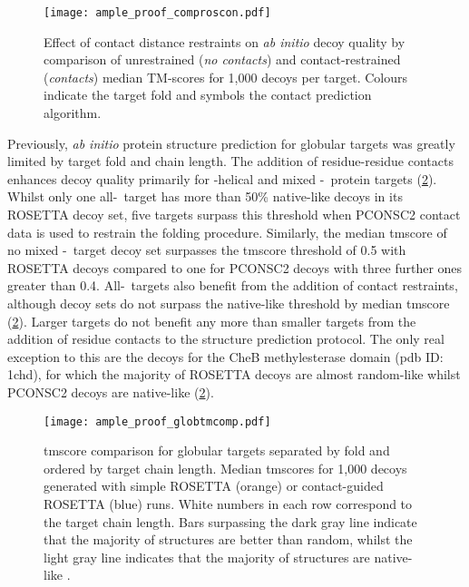 \begin{figure}[H]
    \centering
    \texttt{[image: ample\_proof\_comproscon.pdf]}
    \caption[Effect of contact distance restraints on \textit{ab initio} decoy quality]{Effect of contact distance restraints on \textit{ab initio} decoy quality by comparison of unrestrained (\textit{no contacts}) and contact-restrained (\textit{contacts}) median TM-scores for 1,000 decoys per target. Colours indicate the target fold and symbols the contact prediction algorithm.}
    \label{fig:ample_proof_comproscon}
\end{figure}

Previously, \textit{ab initio} protein structure prediction for globular targets was greatly limited by target fold and chain length. The addition of residue-residue contacts enhances decoy quality primarily for \textalpha-helical and mixed \textalpha-\textbeta\ protein targets (\cref{fig:ample_proof_globtmcomp}). Whilst only one all-\textalpha\ target has more than 50\% native-like decoys in its ROSETTA decoy set, five targets surpass this threshold when PCONSC2 contact data is used to restrain the folding procedure. Similarly, the median \gls{tmscore} of no mixed \textalpha-\textbeta\ target decoy set surpasses the \gls{tmscore} threshold of 0.5 with ROSETTA decoys compared to one for PCONSC2 decoys with three further ones greater than 0.4. All-\textbeta\ targets also benefit from the addition of contact restraints, although decoy sets do not surpass the native-like threshold by median \gls{tmscore} (\cref{fig:ample_proof_globtmcomp}). Larger targets do not benefit any more than smaller targets from the addition of residue contacts to the structure prediction protocol. The only real exception to this are the decoys for the CheB methylesterase domain (\gls{pdb} ID: 1chd), for which the majority of ROSETTA decoys are almost random-like whilst PCONSC2 decoys are native-like (\cref{fig:ample_proof_globtmcomp}).

\begin{figure}[H]
    \centering
    \texttt{[image: ample\_proof\_globtmcomp.pdf]}
    \caption[TM-score comparison for globular targets separated by fold]{\gls{tmscore} comparison for globular targets separated by fold and ordered by target chain length. Median \gls{tmscore}s for 1,000 decoys generated with simple ROSETTA (orange) or contact-guided ROSETTA (blue) runs. White numbers in each row correspond to the target chain length. Bars surpassing the dark gray line indicate that the majority of structures are better than random, whilst the light gray line indicates that the majority of structures are native-like \cite{Xu2010-kr}.}
    \label{fig:ample_proof_globtmcomp}
\end{figure}

